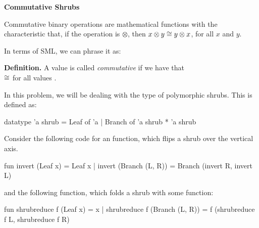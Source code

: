 
\newpage


\textbf{Commutative Shrubs}

Commutative binary operations are mathematical functions with the characteristic
that, if the operation is $\otimes$, then $x \otimes y \cong y \otimes x$, for
all $x$ and $y$.

In terms of SML, we can phrase it as:

\textbf{Definition.} A value  is called \textit{commutative} if
we have that \\
 $\cong$  for all values .

In this problem, we will be dealing with the type of polymorphic shrubs. This is
defined as:
\begin{codeblock}
  datatype 'a shrub =
      Leaf of 'a
    | Branch of 'a shrub * 'a shrub
\end{codeblock}

Consider the following code for an  function,
which flips a shrub over the vertical axis.
\begin{codeblock}
  fun invert (Leaf x) = Leaf x
    | invert (Branch (L, R)) =
        Branch (invert R, invert L)
\end{codeblock}
and the following  function, which folds a shrub with
some function:
\begin{codeblock}
  fun shrubreduce f (Leaf x) = x
    | shrubreduce f (Branch (L, R)) =
        f (shrubreduce f L, shrubreduce f R)
\end{codeblock}

